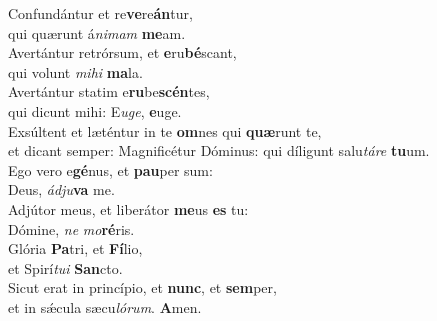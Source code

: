\evenverse Confundántur et re\textbf{ve}re\textbf{án}tur,~\*\\
\evenverse qui quærunt á\textit{ni}\textit{mam} \textbf{me}am.\\
\oddverse Avertántur retrórsum, et \textbf{e}ru\textbf{bé}scant,~\*\\
\oddverse qui volunt \textit{mi}\textit{hi} \textbf{ma}la.\\
\evenverse Avertántur statim e\textbf{ru}be\textbf{scén}tes,~\*\\
\evenverse qui dicunt mihi: E\textit{u}\textit{ge}, \textbf{e}uge.\\
\oddverse Exsúltent et læténtur in te \textbf{om}nes qui \textbf{quæ}runt te,~\*\\
\oddverse et dicant semper: Magnificétur Dóminus: qui díligunt salu\textit{tá}\textit{re} \textbf{tu}um.\\
\evenverse Ego vero e\textbf{gé}nus, et \textbf{pau}per sum:~\*\\
\evenverse Deus, \textit{ád}\textit{ju}\textbf{va} me.\\
\oddverse Adjútor meus, et liberátor \textbf{me}us \textbf{es} tu:~\*\\
\oddverse Dómine, \textit{ne} \textit{mo}\textbf{ré}ris.\\
\evenverse Glória \textbf{Pa}tri, et \textbf{Fí}lio,~\*\\
\evenverse et Spirí\textit{tu}\textit{i} \textbf{San}cto.\\
\oddverse Sicut erat in princípio, et \textbf{nunc}, et \textbf{sem}per,~\*\\
\oddverse et in sǽcula sæcu\textit{ló}\textit{rum}. \textbf{A}men.\\
